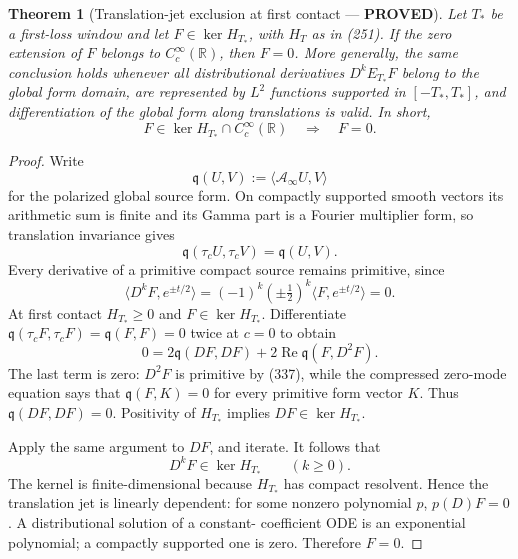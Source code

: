 \documentclass[11pt]{article}
\newtheorem{theorem}{Theorem}
\newcommand{\PROVED}{\textcolor{green!45!black}{\textbf{PROVED}}}
\begin{document}
\begin{theorem}[Translation-jet exclusion at first contact --- \PROVED]
Let $T_*$ be a first-loss window and let $F\in\ker H_{T_*}$, with $H_T$
as in (251).  If the zero extension of $F$ belongs to
$C_c^\infty(\mathbb R)$, then $F=0$.  More generally, the same conclusion
holds whenever all distributional derivatives $D^kE_{T_*}F$ belong to the
global form domain, are represented by $L^2$ functions supported in
$[-T_*,T_*]$, and differentiation of the global form along translations is
valid.  In short,
\begin{equation}
 \boxed{F\in\ker H_{T_*}\cap C_c^\infty(\mathbb R)
        \quad\Longrightarrow\quad F=0.}              \tag{335}
\end{equation}
\end{theorem}

\begin{proof}
Write
\[
 \mathfrak q(U,V):=\langle\mathcal A_\infty U,V\rangle
\]
for the polarized global source form.  On compactly supported smooth
vectors its arithmetic sum is finite and its Gamma part is a Fourier
multiplier form, so translation invariance gives
\begin{equation}
 \mathfrak q(\tau_cU,\tau_cV)=\mathfrak q(U,V).       \tag{336}
\end{equation}
Every derivative of a primitive compact source remains primitive, since
\[
 \langle D^kF,e^{\pm t/2}\rangle
   =(-1)^k(\pm\tfrac12)^k
       \langle F,e^{\pm t/2}\rangle=0.               \tag{337}
\]
At first contact $H_{T_*}\ge0$ and $F\in\ker H_{T_*}$.  Differentiate
$\mathfrak q(\tau_cF,\tau_cF)=\mathfrak q(F,F)=0$
twice at $c=0$ to obtain
\begin{equation}
 0=2\mathfrak q(DF,DF)
     +2\operatorname{Re}\mathfrak q(F,D^2F).         \tag{338}
\end{equation}
The last term is zero: $D^2F$ is primitive by (337), while the compressed
zero-mode equation says that $\mathfrak q(F,K)=0$ for every primitive form
vector $K$.  Thus $\mathfrak q(DF,DF)=0$.  Positivity of $H_{T_*}$ implies
$DF\in\ker H_{T_*}$.

Apply the same argument to $DF$, and iterate.  It follows that
\begin{equation}
              D^kF\in\ker H_{T_*}\qquad(k\ge0).     \tag{339}
\end{equation}
The kernel is finite-dimensional because $H_{T_*}$ has compact resolvent.
Hence the translation jet is linearly dependent: for some nonzero
polynomial $p$, $p(D)F=0$.  A distributional solution of a constant-
coefficient ODE is an exponential polynomial; a compactly supported one is
zero.  Therefore $F=0$.
\end{proof}
\end{document}

